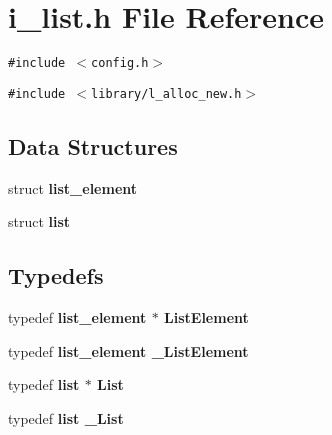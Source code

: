\section{i\_\-list.h File Reference}
\label{i__list_8h}
{\tt \#include $<$config.h$>$}\par
{\tt \#include $<$library/l\_\-alloc\_\-new.h$>$}\par
\subsection*{Data Structures}
\begin{CompactItemize}
\item 
struct \bf{list\_\-element}
\item 
struct \bf{list}
\end{CompactItemize}
\subsection*{Typedefs}
\begin{CompactItemize}
\item 
typedef \bf{list\_\-element} $\ast$ \bf{List\-Element}
\item 
typedef \bf{list\_\-element} \bf{\_\-List\-Element}
\item 
typedef \bf{list} $\ast$ \bf{List}
\item 
typedef \bf{list} \bf{\_\-List}
\end{CompactItemize}
